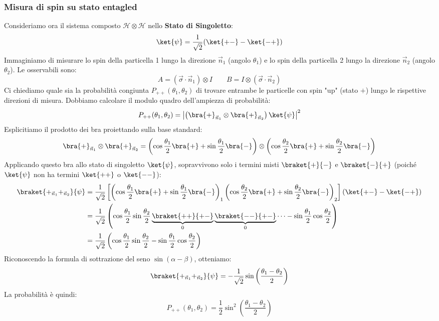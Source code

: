 \subsubsection{Misura di spin su stato entagled}
Consideriamo ora il sistema composto \(\mathcal{H} \otimes \mathcal{H}\) nello \textbf{Stato di Singoletto}:
\[
    \ket{\psi} = \frac{1}{\sqrt{2}} (\ket{+-} - \ket{-+})
\]
Immaginiamo di misurare lo spin della particella 1 lungo la direzione \(\vec{n}_1\) (angolo \(\theta_1\)) e lo spin della particella 2 lungo la direzione \(\vec{n}_2\) (angolo \(\theta_2\)).
Le osservabili sono:
\[
    A = (\vec{\sigma} \cdot \vec{n}_1) \otimes I \qquad B = I \otimes (\vec{\sigma} \cdot \vec{n}_2)
\]
Ci chiediamo quale sia la probabilità congiunta \(P_{++}(\theta_1, \theta_2)\) di trovare entrambe le particelle con spin "up" (stato \(+\)) lungo le rispettive direzioni di misura. Dobbiamo calcolare il modulo quadro dell'ampiezza di probabilità:
\[
    P_{++}(\theta_1, \theta_2) = \left| \left( \bra{+}_{\vec{n}_1} \otimes \bra{+}_{\vec{n}_2} \right) \ket{\psi} \right|^2
\]
Esplicitiamo il prodotto dei bra proiettando sulla base standard:
\[
    \bra{+}_{\vec{n}_1} \otimes \bra{+}_{\vec{n}_2} = \left( \cos\frac{\theta_1}{2}\bra{+} + \sin\frac{\theta_1}{2}\bra{-} \right) \otimes \left( \cos\frac{\theta_2}{2}\bra{+} + \sin\frac{\theta_2}{2}\bra{-} \right)
\]
Applicando questo bra allo stato di singoletto \(\ket{\psi}\), sopravvivono solo i termini misti \(\braket{+}{-}\) e \(\braket{-}{+}\) (poiché \(\ket{\psi}\) non ha termini \(\ket{++}\) o \(\ket{--}\)):
\begin{align*}
    \braket{+_{\vec{n}_1} +_{\vec{n}_2}}{\psi} &= \frac{1}{\sqrt{2}} \left[ \left( \cos\frac{\theta_1}{2}\bra{+} + \sin\frac{\theta_1}{2}\bra{-} \right)_1 \left( \cos\frac{\theta_2}{2}\bra{+} + \sin\frac{\theta_2}{2}\bra{-} \right)_2 \right] (\ket{+-} - \ket{-+}) \\
    &= \frac{1}{\sqrt{2}} \left( \cos\frac{\theta_1}{2}\sin\frac{\theta_2}{2} \underbrace{\braket{++}{+-}}_{0} \underbrace{\braket{--}{+-}}_{0} \dots - \sin\frac{\theta_1}{2}\cos\frac{\theta_2}{2} \right) \\
    &= \frac{1}{\sqrt{2}} \left( \cos\frac{\theta_1}{2}\sin\frac{\theta_2}{2} - \sin\frac{\theta_1}{2}\cos\frac{\theta_2}{2} \right)
\end{align*}
Riconoscendo la formula di sottrazione del seno \(\sin(\alpha-\beta)\), otteniamo:
\[
    \braket{+_{\vec{n}_1} +_{\vec{n}_2}}{\psi} = -\frac{1}{\sqrt{2}} \sin\left( \frac{\theta_1 - \theta_2}{2} \right)
\]
La probabilità è quindi:
\begin{equation}
    P_{++}(\theta_1, \theta_2) = \frac{1}{2} \sin^2\left( \frac{\theta_1 - \theta_2}{2} \right)
\end{equation}

